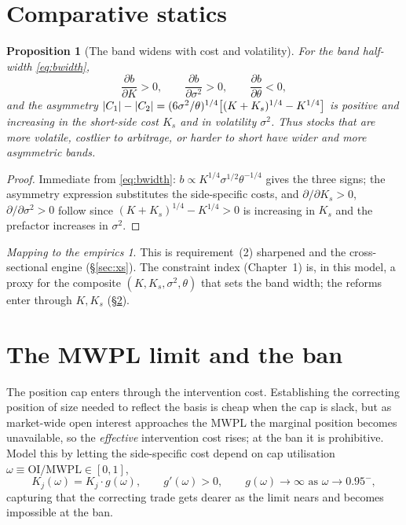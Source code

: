 \documentclass[11pt,a4paper]{article}
\DeclarePairedDelimiter{\abs}{\lvert}{\rvert}
\theoremstyle{plain}
\newtheorem{proposition}{Proposition}
\theoremstyle{definition}
\theoremstyle{remark}
\newtheorem*{takeaway}{Mapping to the empirics}
\begin{document}
\section{Comparative statics}\label{sec:cs}
\begin{proposition}[The band widens with cost and volatility]\label{prop:cs}
For the band half-width \eqref{eq:bwidth},
\begin{equation}
\frac{\partial b}{\partial K}>0,\qquad \frac{\partial b}{\partial \sigma^2}>0,\qquad \frac{\partial b}{\partial \theta}<0,
\end{equation}
and the asymmetry $\abs{C_1}-\abs{C_2}=(6\sigma^2/\theta)^{1/4}\big[(K+K_s)^{1/4}-K^{1/4}\big]$ is positive and increasing in the short-side cost $K_s$ and in volatility $\sigma^2$. Thus stocks that are more volatile, costlier to arbitrage, or harder to short have wider and more asymmetric bands.
\end{proposition}
\begin{proof}
Immediate from \eqref{eq:bwidth}: $b\propto K^{1/4}\sigma^{1/2}\theta^{-1/4}$ gives the three signs; the asymmetry expression substitutes the side-specific costs, and $\partial/\partial K_s>0$, $\partial/\partial\sigma^2>0$ follow since $(K+K_s)^{1/4}-K^{1/4}>0$ is increasing in $K_s$ and the prefactor increases in $\sigma^2$.
\end{proof}

\begin{takeaway}
This is requirement~(2) sharpened and the cross-sectional engine (\S\ref{sec:xs}). The constraint index (Chapter~1) is, in this model, a proxy for the composite $(K,K_s,\sigma^2,\theta)$ that sets the band width; the reforms enter through $K,K_s$ (\S\ref{sec:ban}).
\end{takeaway}

\section{The MWPL limit and the ban}\label{sec:ban}
The position cap enters through the intervention cost. Establishing the correcting position of size needed to reflect the basis is cheap when the cap is slack, but as market-wide open interest approaches the MWPL the marginal position becomes unavailable, so the \emph{effective} intervention cost rises; at the ban it is prohibitive. Model this by letting the side-specific cost depend on cap utilisation $\omega\equiv \text{OI}/\mathrm{MWPL}\in[0,1]$,
\begin{equation}
K_j(\omega) = K_j\cdot g(\omega), \qquad g'(\omega)>0,\qquad g(\omega)\to\infty \text{ as } \omega\to 0.95^{-}, \label{eq:Komega}
\end{equation}
capturing that the correcting trade gets dearer as the limit nears and becomes impossible at the ban.
\end{document}

